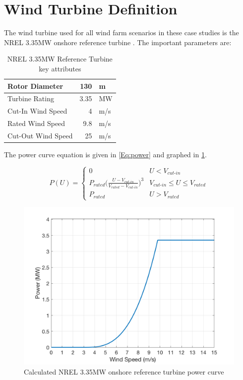\documentclass[12pt]{article}
\begin{document}
\newpage
\appendix
\section{Wind Turbine Definition} \label{App:NREL335MW}
    The wind turbine used for all wind farm scenarios in these case studies is the NREL 3.35MW onshore reference turbine \cite{NREL335MW}. The important parameters are:
    
    \begin{table}[H]
        \caption{NREL 3.35MW Reference Turbine key attributes \cite{NREL335MW}}
        \centering
        \begin{tabular}{|l|r l|}
            \hline
            Rotor Diameter & 130 & m \\ \hline
            Turbine Rating & 3.35 & MW \\ \hline
            Cut-In Wind Speed & 4 & m/s \\ \hline
            Rated Wind Speed & 9.8 & m/s \\ \hline
            Cut-Out Wind Speed & 25 & m/s \\
            \hline
        \end{tabular}
        \label{tab:my_label}
    \end{table}
    
    \noindent The power curve equation is given in \cref{Eq:power} and graphed in \cref{Fig:curve}.
    
    \begin{equation}
        P(U) = 
            \begin{cases} 
                  0 & U < V_{\textit{cut-in}} \\
                  P_{\textit{rated}}\bigg(\frac{U-V_{\textit{cut-in}}}{V_{\textit{rated}}-V_{\textit{cut-in}}}\bigg)^3 & V_{\textit{cut-in}}\leq U \leq V_{\textit{rated}} \\
                  P_{\textit{rated}} & U > V_{\textit{rated}}
            \end{cases}
        \label{Eq:power}
    \end{equation}
    
    \begin{figure}[H]
        \centering
        \caption{Calculated NREL 3.35MW onshore reference turbine power curve \label{Fig:curve}}
        \includegraphics[width=0.75\linewidth]{power-curve.png}
    \end{figure}
\end{document}
